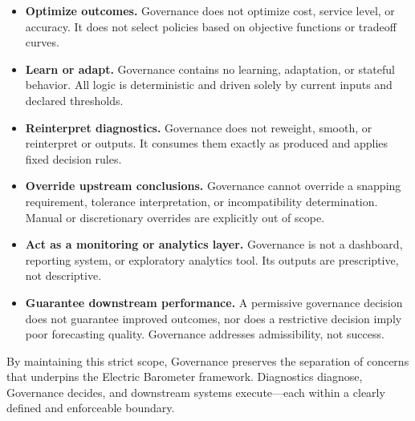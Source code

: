 \begin{itemize}
  \item \textbf{Optimize outcomes.}
  Governance does not optimize cost, service level, or accuracy. It does not
  select policies based on objective functions or tradeoff curves.

  \item \textbf{Learn or adapt.}
  Governance contains no learning, adaptation, or stateful behavior. All logic
  is deterministic and driven solely by current inputs and declared thresholds.

  \item \textbf{Reinterpret diagnostics.}
  Governance does not reweight, smooth, or reinterpret \DQC{} or \FPC{} outputs.
  It consumes them exactly as produced and applies fixed decision rules.

  \item \textbf{Override upstream conclusions.}
  Governance cannot override a snapping requirement, tolerance interpretation,
  or incompatibility determination. Manual or discretionary overrides are
  explicitly out of scope.

  \item \textbf{Act as a monitoring or analytics layer.}
  Governance is not a dashboard, reporting system, or exploratory analytics
  tool. Its outputs are prescriptive, not descriptive.

  \item \textbf{Guarantee downstream performance.}
  A permissive governance decision does not guarantee improved outcomes, nor
  does a restrictive decision imply poor forecasting quality. Governance
  addresses admissibility, not success.
\end{itemize}

By maintaining this strict scope, Governance preserves the separation of
concerns that underpins the Electric Barometer framework. Diagnostics diagnose,
Governance decides, and downstream systems execute—each within a clearly defined
and enforceable boundary.
